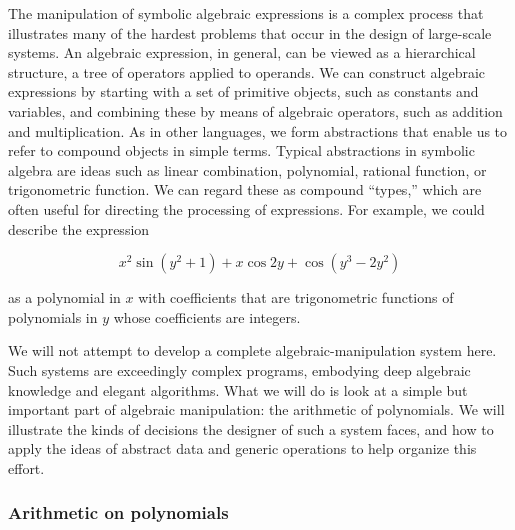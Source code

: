 The manipulation of symbolic algebraic expressions is a complex process that
illustrates many of the hardest problems that occur in the design of
large-scale systems.  An algebraic expression, in general, can be viewed as a
hierarchical structure, a tree of operators applied to operands.  We can
construct algebraic expressions by starting with a set of primitive objects,
such as constants and variables, and combining these by means of algebraic
operators, such as addition and multiplication.  As in other languages, we form
abstractions that enable us to refer to compound objects in simple terms.
Typical abstractions in symbolic algebra are ideas such as linear combination,
polynomial, rational function, or trigonometric function.  We can regard these
as compound ``types,'' which are often useful for directing the processing of
expressions.  For example, we could describe the expression
\begin{comment}

\begin{example}
x^2 sin (y^2 + 1) + x cos 2y + cos(y^3 - 2y^2)
\end{example}

\end{comment}

$$ x^2 \sin (y^2 + 1) + x \cos 2y + \cos(y^3 - 2y^2) $$

\noindent
as a polynomial in \( x \) with coefficients that are trigonometric functions of
polynomials in \( y \) whose coefficients are integers.

We will not attempt to develop a complete algebraic-manipulation system here.
Such systems are exceedingly complex programs, embodying deep algebraic
knowledge and elegant algorithms.  What we will do is look at a simple but
important part of algebraic manipulation: the arithmetic of polynomials.  We
will illustrate the kinds of decisions the designer of such a system faces, and
how to apply the ideas of abstract data and generic operations to help organize
this effort.

\subsubsection*{Arithmetic on polynomials}


